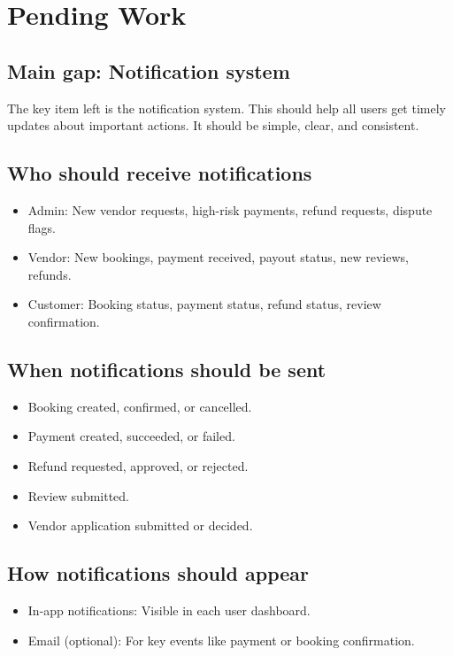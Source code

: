 \chapter{Pending Work}

\section{Main gap: Notification system}
The key item left is the notification system. This should help all users get timely updates about important actions. It should be simple, clear, and consistent.

\section{Who should receive notifications}
\begin{itemize}
  \item Admin: New vendor requests, high-risk payments, refund requests, dispute flags.
  \item Vendor: New bookings, payment received, payout status, new reviews, refunds.
  \item Customer: Booking status, payment status, refund status, review confirmation.
\end{itemize}

\section{When notifications should be sent}
\begin{itemize}
  \item Booking created, confirmed, or cancelled.
  \item Payment created, succeeded, or failed.
  \item Refund requested, approved, or rejected.
  \item Review submitted.
  \item Vendor application submitted or decided.
\end{itemize}

\section{How notifications should appear}
\begin{itemize}
  \item In-app notifications: Visible in each user dashboard.
  \item Email (optional): For key events like payment or booking confirmation.
\end{itemize}


